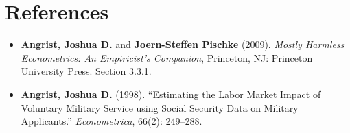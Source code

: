 \documentclass[12pt]{article}
\begin{document}
\section*{\noindent\textbf{References}}

\begin{itemize}
    \item \textbf{Angrist, Joshua D.} and \textbf{Joern-Steffen Pischke} (2009). 
    \textit{Mostly Harmless Econometrics: An Empiricist’s Companion}, 
    Princeton, NJ: Princeton University Press. Section 3.3.1.

    \item \textbf{Angrist, Joshua D.} (1998). 
    ``Estimating the Labor Market Impact of Voluntary Military Service using Social Security Data on Military Applicants.'' 
    \textit{Econometrica}, 66(2): 249--288.
\end{itemize}
\end{document}

